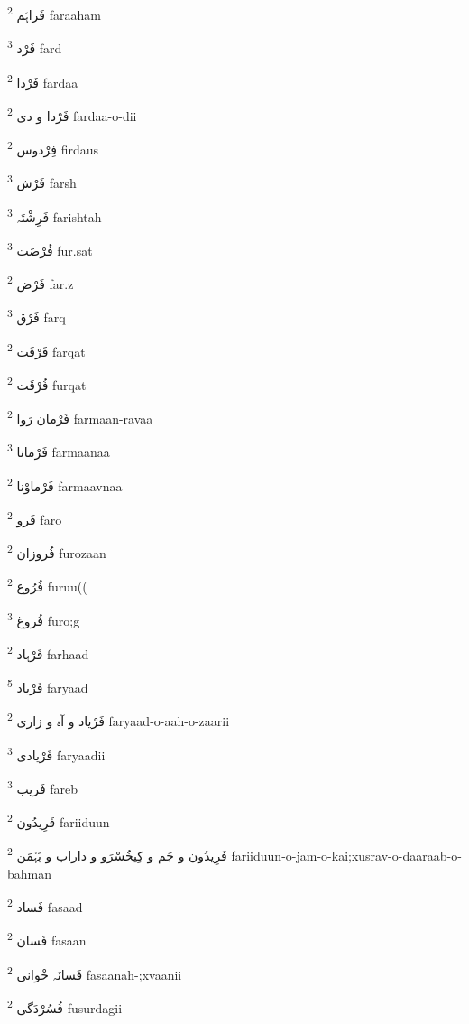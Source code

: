 \documentclass[12pt]{article}
\begin{document}
\begin{multicols}{5}
{\ur فَراہَم}   \textsuperscript{2} faraaham

{\ur فَرْد}   \textsuperscript{3} fard

{\ur فَرْدا}   \textsuperscript{2} fardaa

{\ur فَرْدا و دی}   \textsuperscript{2} fardaa-o-dii

{\ur فِرْدوس}   \textsuperscript{2} firdaus

{\ur فَرْش}   \textsuperscript{3} farsh

{\ur فَرِشْتَہ}   \textsuperscript{3} farishtah

{\ur فُرْصَت}   \textsuperscript{3} fur.sat

{\ur فَرْض}   \textsuperscript{2} far.z

{\ur فَرْق}   \textsuperscript{3} farq

{\ur فَرْقَت}   \textsuperscript{2} farqat

{\ur فُرْقَت}   \textsuperscript{2} furqat

{\ur فَرْمان رَوا}   \textsuperscript{2} farmaan-ravaa

{\ur فَرْمانا}   \textsuperscript{3} farmaanaa

{\ur فَرْماوْنا}   \textsuperscript{2} farmaavnaa

{\ur فَرو}   \textsuperscript{2} faro

{\ur فُروزان}   \textsuperscript{2} furozaan

{\ur فُرُوع}   \textsuperscript{2} furuu((

{\ur فُروغ}   \textsuperscript{3} furo;g

{\ur فَرْہاد}   \textsuperscript{2} farhaad

{\ur فَرْیاد}   \textsuperscript{5} faryaad

{\ur فَرْیاد و آہ و زاری}   \textsuperscript{2} faryaad-o-aah-o-zaarii

{\ur فَرْیادی}   \textsuperscript{3} faryaadii

{\ur فَریب}   \textsuperscript{3} fareb

{\ur فَرِیدُون}   \textsuperscript{2} fariiduun

{\ur فَرِیدُون و جَم و کِیخُسْرَو و داراب و بَہْمَن}   \textsuperscript{2} fariiduun-o-jam-o-kai;xusrav-o-daaraab-o-bahman

{\ur فَساد}   \textsuperscript{2} fasaad

{\ur فَسان}   \textsuperscript{2} fasaan

{\ur فَسانَہ خْوانی}   \textsuperscript{2} fasaanah-;xvaanii

{\ur فُسُرْدَگی}   \textsuperscript{2} fusurdagii


\end{multicols}
\end{document}
